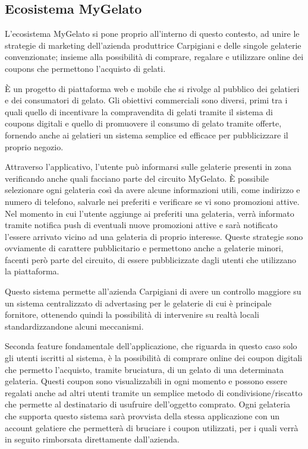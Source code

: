 \subsection{Ecosistema MyGelato}

L'ecosistema MyGelato si pone proprio all'interno di questo contesto, ad unire le strategie di marketing dell'azienda produttrice Carpigiani e delle singole gelaterie convenzionate; insieme alla possibilità di comprare, regalare e utilizzare online dei coupons che permettono l'acquisto di gelati.

È un progetto di piattaforma web e mobile che si rivolge al pubblico dei gelatieri e dei consumatori di gelato. Gli obiettivi commerciali sono diversi, primi tra i quali quello di incentivare la compravendita di gelati tramite il sistema di coupons digitali e quello di promuovere il consumo di gelato tramite offerte, fornendo anche ai gelatieri un sistema semplice ed efficace per pubblicizzare il proprio negozio.

Attraverso l'applicativo, l'utente può informarsi sulle gelaterie presenti in zona verificando anche quali facciano parte del circuito MyGelato.
È possibile selezionare ogni gelateria così da avere alcune informazioni utili, come indirizzo e numero di telefono, salvarle nei preferiti e verificare se vi sono promozioni attive.
Nel momento in cui l'utente aggiunge ai preferiti una gelateria, verrà informato tramite notifica push di eventuali nuove promozioni attive e sarà notificato l'essere arrivato vicino ad una gelateria di proprio interesse.
Queste strategie sono ovviamente di carattere pubblicitario e permettono anche a gelaterie minori, facenti però parte del circuito, di essere pubblicizzate dagli utenti che utilizzano la piattaforma.

Questo sistema permette all'azienda Carpigiani di avere un controllo maggiore su un sistema centralizzato di advertasing per le gelaterie di cui è principale fornitore, ottenendo quindi la possibilità di intervenire su realtà locali standardizzandone alcuni meccanismi.

Seconda feature fondamentale dell'applicazione, che riguarda in questo caso solo gli utenti iscritti al sistema, è la possibilità di comprare online dei coupon digitali che permetto l'acquisto, tramite bruciatura, di un gelato di una determinata gelateria.
Questi coupon sono visualizzabili in ogni momento e possono essere regalati anche ad altri utenti tramite un semplice metodo di condivisione/riscatto che permette al destinatario di usufruire dell'oggetto comprato.
Ogni gelateria che supporta questo sistema sarà provvista della stessa applicazione con un account gelatiere che permetterà di bruciare i coupon utilizzati, per i quali verrà in seguito rimborsata direttamente dall'azienda.

